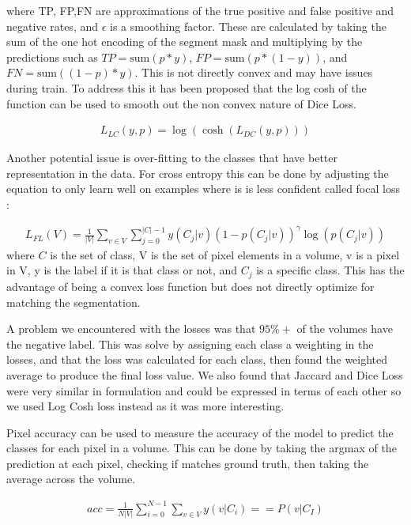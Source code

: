 \documentclass[10pt,twocolumn,letterpaper]{article}
\begin{document}
where TP, FP,FN are approximations of the true positive and false positive and negative rates, and $\epsilon$ is a smoothing factor. These are calculated by taking the sum of the one hot encoding of the segment mask and multiplying by the predictions such as  $TP = \text{sum}(p*y)$, $FP = \text{sum}(p*(1-y))$, and $FN = \text{sum}((1-p)*y)$. This is not directly convex and may have issues during train. To address this it has been proposed that the log cosh \cite{SEG} of the function can be used to smooth out the non convex nature of Dice Loss.

\begin{align}
L_{LC}(y,p) = \log(\cosh(L_{DC}(y,p)))
\end{align}

Another potential issue is over-fitting to the classes that have better representation in the data. For cross entropy this can be done by adjusting the equation to only learn well on examples where is is less confident called focal loss \cite{SEG}:

\begin{align}
L_{FL}(V) = \frac{1}{|V|} \sum_{v \in V}  \sum_{j = 0 }^{|C|-1} y(C_j|v) (1-p(C_j|v))^\gamma  \log(p(C_j|v) ) 
\end{align}
where $C$ is the set of class, V is the set of pixel elements in a volume, v is a pixel in V, y is the label if it is that class or not, and $C_j$ is a specific class. This has the advantage of being a convex loss function but does not directly optimize for matching the segmentation.


A problem we encountered with the losses was that $95 \% + $ of the volumes have the negative label. This was solve by assigning each class a weighting in the losses, and that the loss was calculated for each class, then found the weighted average to produce the final loss value. We also found that Jaccard and Dice Loss were very similar in formulation and could be expressed in terms of each other so we used Log Cosh loss instead as it was more interesting.

Pixel accuracy \cite{MET} can be used to measure the accuracy of the model to predict the classes for each pixel in a volume. This can be done by taking the argmax of the prediction at each pixel, checking if matches ground truth, then taking the average across the volume. 

\begin{align}
acc = \frac{1}{N |V|} \sum_{i=0}^{N-1} \sum_{v \in V} y(v|C_i) == P(v|C_I)
\end{align}
\end{document}
